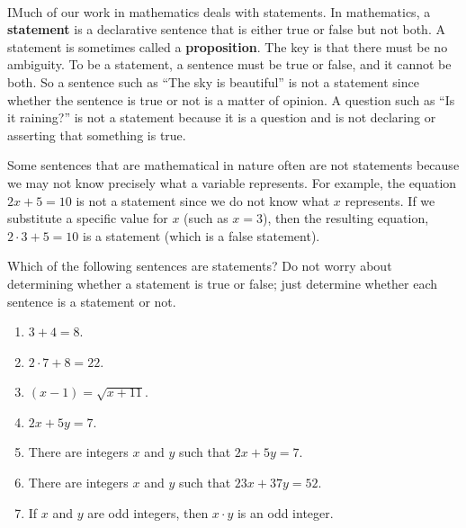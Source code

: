 %
\begin{previewactivity}[Statements]\label{PA:prop} \hfill \\
IMuch of our work in mathematics deals with statements.  In mathematics, a \textbf{statement}
\label{D:prop}%
%
  is a declarative sentence that is either true or false but not both.    
A statement is sometimes called a \textbf{proposition}.
%
The key is that there must be no ambiguity.  To be a statement, a sentence must be  true or false, and it cannot be both.  So a sentence such as ``The sky is beautiful'' is not a statement since whether the sentence is true or not is a matter of opinion.  A question such as ``Is it raining?'' is not a statement because it is a question and is not declaring or asserting that something is true.

Some sentences that are mathematical in nature often are not statements because we may not know precisely what a variable represents.  For example, the equation $2x + 5 = 10$ is not a statement since we do not know what $x$ represents.  If we substitute a specific value for $x$ (such as $x = 3$), then the resulting equation, $2 \cdot 3 + 5 = 10$ is a statement (which is a false statement). 

Which of the following sentences are statements?  Do not worry about determining whether a statement is true or false; just determine whether each sentence is a statement or not.

\begin{multicols}{2}
\begin{enumerate}
\item $3 + 4 = 8$.

\item $2 \cdot 7 + 8 = 22$.

\item	$\left( {x - 1} \right) = \sqrt {x + 11}$.

\item $2x + 5y = 7$.\label{PA:prop3}
\end{enumerate}
\end{multicols}
\begin{enumerate} \setcounter{enumi}{4}
\item There are integers  $x$  and  $y$  such that $2x + 5y = 7.$\label{PA:prop4}

\item There are integers  $x$  and  $y$  such that $23x + 37y = 52.$

\item If  $x$  and  $y$  are odd integers, then $x \cdot y$ is an odd integer.


\end{enumerate}
\end{previewactivity}
